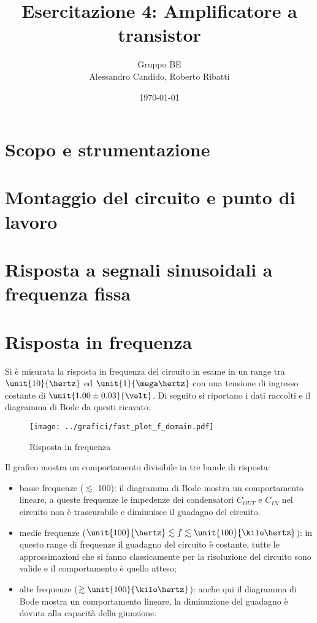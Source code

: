 \documentclass[10pt,a4paper]{article}
\title{Esercitazione 4: Amplificatore a transistor}
\author{Gruppo BE \\ Alessandro Candido, Roberto Ribatti}
\date{\today}
\begin{document}
\maketitle

\section{Scopo e strumentazione}

\section{Montaggio del circuito e punto di lavoro}

\section{Risposta a segnali sinusoidali a frequenza fissa}

\section{Risposta in frequenza}

Si è misurata la risposta in frequenza del circuito in esame in un range tra $\unit{10}{\hertz}$ ed $\unit{1}{\mega\hertz}$ con una tensione di ingresso costante di $\unit{1.00 \pm 0.03}{\volt}$. Di seguito si riportano i dati raccolti e il diagramma di Bode da questi ricavato.

\begin{figure}[h!]
	\centering
	\begin{minipage}[c]{0.3\textwidth}
		\centering
		\resizebox{\textwidth}{!}{
			}
	\end{minipage}
	\begin{minipage}[c]{0.69\textwidth}
		\centering
		\texttt{[image: ../grafici/fast\_plot\_f\_domain.pdf]}
		\caption{Risposta in frequenza}
		\label{early}
	\end{minipage}
\end{figure}

Il grafico mostra un comportamento divisibile in tre bande di risposta:
\begin{itemize}
	\item basse frequenze ($\lesssim$ \unit{100}{\hertz}): il diagramma di Bode mostra un comportamento lineare, a queste frequenze le impedenze dei condensatori $C_{OUT}$ e $C_{IN}$ nel circuito non è trascurabile e diminuisce il guadagno del circuito.
	\item medie frequenze ($\unit{100}{\hertz} \lesssim f \lesssim \unit{100}{\kilo\hertz}$): in questo range di frequenze il guadagno del circuito è costante, tutte le approssimazioni che si fanno classicamente per la risoluzione del circuito sono valide e il comportamento è quello atteso;
	\item alte frequenze ($\gtrsim \unit{100}{\kilo\hertz}$): anche qui il diagramma di Bode mostra un comportamento lineare, la diminuzione del guadagno è dovuta alla capacità della giunzione.
\end{itemize}
\end{document}
